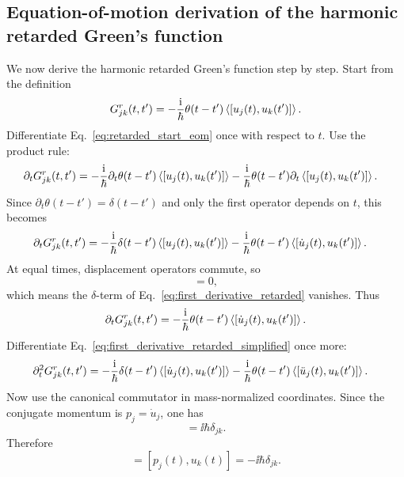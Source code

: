 \subsection{Equation-of-motion derivation of the harmonic retarded Green's function}
We now derive the harmonic retarded Green's function step by step. Start from the definition
\begin{equation}
    G^r_{jk}(t,t') = -\frac{\mathrm{i}}{\hbar}\theta(t-t')\left\langle [u_j(t),u_k(t')] \right\rangle. 
    \label{eq:retarded_start_eom}
\end{equation}
Differentiate Eq.~\eqref{eq:retarded_start_eom} once with respect to $t$. Use the product rule:
\begin{align}
    \partial_t G^r_{jk}(t,t')
    &= -\frac{\mathrm{i}}{\hbar}\partial_t\theta(t-t')\left\langle [u_j(t),u_k(t')] \right\rangle 
       -\frac{\mathrm{i}}{\hbar}\theta(t-t')\partial_t\left\langle [u_j(t),u_k(t')] \right\rangle. 
\end{align}
Since $\partial_t\theta(t-t') = \delta(t-t')$ and only the first operator depends on $t$, this becomes
\begin{align}
    \partial_t G^r_{jk}(t,t')
    &= -\frac{\mathrm{i}}{\hbar}\delta(t-t')\left\langle [u_j(t),u_k(t')] \right\rangle 
       -\frac{\mathrm{i}}{\hbar}\theta(t-t')\left\langle [\dot u_j(t),u_k(t')] \right\rangle. 
    \label{eq:first_derivative_retarded}
\end{align}
At equal times, displacement operators commute, so
\begin{equation}
    [u_j(t),u_k(t)] = 0,
\end{equation}
which means the $\delta$-term of Eq.~\eqref{eq:first_derivative_retarded} vanishes. Thus
\begin{equation}
    \partial_t G^r_{jk}(t,t') = -\frac{\mathrm{i}}{\hbar}\theta(t-t')\left\langle [\dot u_j(t),u_k(t')] \right\rangle. 
    \label{eq:first_derivative_retarded_simplified}
\end{equation}
Differentiate Eq.~\eqref{eq:first_derivative_retarded_simplified} once more:
\begin{align}
    \partial_t^2 G^r_{jk}(t,t')
    &= -\frac{\mathrm{i}}{\hbar}\delta(t-t')\left\langle [\dot u_j(t),u_k(t')] \right\rangle 
       -\frac{\mathrm{i}}{\hbar}\theta(t-t')\left\langle [\ddot u_j(t),u_k(t')] \right\rangle. 
    \label{eq:second_derivative_retarded}
\end{align}
Now use the canonical commutator in mass-normalized coordinates. Since the conjugate momentum is $p_j = \dot u_j$, one has
\begin{equation}
    [u_j(t),p_k(t)] = \ii\hbar\delta_{jk}.
\end{equation}
Therefore
\begin{equation}
    [\dot u_j(t),u_k(t)] = [p_j(t),u_k(t)] = -\ii\hbar\delta_{jk}.
    \label{eq:canonical_commutator_udot_u}
\end{equation}
